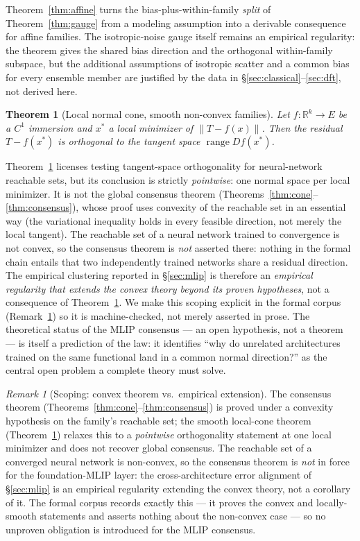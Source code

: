 \documentclass[11pt]{article}
\newtheorem{theorem}{Theorem}
\theoremstyle{remark}
\newtheorem{remark}{Remark}
\begin{document}
Theorem~\ref{thm:affine} turns the bias-plus-within-family \emph{split} of
Theorem~\ref{thm:gauge} from a modeling assumption into a derivable
consequence for affine families. The isotropic-noise gauge itself remains an
empirical regularity: the theorem gives the shared bias direction and the
orthogonal within-family subspace, but the additional assumptions of isotropic
scatter and a common bias for every ensemble member are justified by the data
in \S\ref{sec:classical}--\ref{sec:dft}, not derived here.

\begin{theorem}[Local normal cone, smooth non-convex families]\label{thm:smooth}
Let $f: \mathbb{R}^k \to E$ be a $C^1$ immersion and $x^*$ a local minimizer
of $\|T - f(x)\|$. Then the residual $T - f(x^*)$ is orthogonal to the tangent
space $\operatorname{range} Df(x^*)$.
\end{theorem}

Theorem~\ref{thm:smooth} licenses testing tangent-space orthogonality for
neural-network reachable sets, but its conclusion is strictly \emph{pointwise}:
one normal space per local minimizer. It is not the global consensus theorem
(Theorems~\ref{thm:cone}--\ref{thm:consensus}), whose proof uses convexity of the
reachable set in an essential way (the variational inequality holds in every
feasible direction, not merely the local tangent). The reachable set of a neural
network trained to convergence is not convex, so the consensus theorem is
\emph{not} asserted there: nothing in the formal chain entails that two
independently trained networks share a residual direction. The empirical
clustering reported in \S\ref{sec:mlip} is therefore an \emph{empirical
regularity that extends the convex theory beyond its proven hypotheses}, not a
consequence of Theorem~\ref{thm:smooth}. We make this scoping explicit in the
formal corpus (Remark~\ref{rem:empirical}) so it is machine-checked, not merely
asserted in prose. The theoretical status of the MLIP consensus --- an open
hypothesis, not a theorem --- is itself a prediction of the law: it identifies
``why do unrelated architectures trained on the same functional land in a common
normal direction?'' as the central open problem a complete theory must solve.

\begin{remark}[Scoping: convex theorem vs.\ empirical extension]\label{rem:empirical}
The consensus theorem (Theorems~\ref{thm:cone}--\ref{thm:consensus}) is proved
under a convexity hypothesis on the family's reachable set; the smooth
local-cone theorem (Theorem~\ref{thm:smooth}) relaxes this to a \emph{pointwise}
orthogonality statement at one local minimizer and does not recover global
consensus. The reachable set of a converged neural network is non-convex, so the
consensus theorem is \emph{not} in force for the foundation-MLIP layer: the
cross-architecture error alignment of \S\ref{sec:mlip} is an empirical
regularity extending the convex theory, not a corollary of it. The formal corpus
records exactly this --- it proves the convex and locally-smooth statements and
asserts nothing about the non-convex case --- so no unproven obligation is
introduced for the MLIP consensus.
\end{remark}
\end{document}
